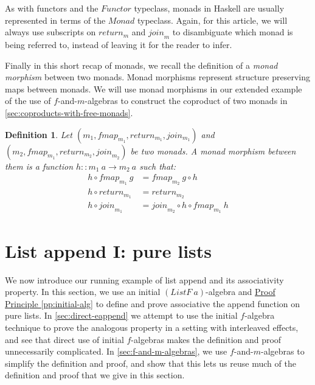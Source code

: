 \documentclass{jfp1}
\newtheorem{definition}{Definition}
\newcommand{\proofprinref}[1]{\hyperref[#1]{Proof Principle \ref*{#1}}}
\begin{document}
As with functors and the $\mathit{Functor}$ typeclass, monads in
Haskell are usually represented in terms of the $\textit{Monad}$
typeclass. Again, for this article, we will always use subscripts on
$\mathit{return}_m$ and $\mathit{join}_m$ to disambiguate which monad
is being referred to, instead of leaving it for the reader to infer.

Finally in this short recap of monads, we recall the definition of a
\emph{monad morphism} between two monads. Monad morphisms represent
structure preserving maps between monads. We will use monad morphisms
in our extended example of the use of $f$-and-$m$-algebras to
construct the coproduct of two monads in
\autoref{sec:coproducts-with-free-monads}.

\begin{definition}
  Let $(m_1, \mathit{fmap_{m_1}}, \mathit{return}_{m_1},
  \mathit{join_{m_1}})$ and $(m_2, \mathit{fmap_{m_1}},
  \mathit{return}_{m_2}, \mathit{join}_{m_2})$ be two monads. A
  \emph{monad morphism} between them is a function $h :: m_1~a \to
  m_2~a$ such that:
  \begin{align}
    \label{eq:monad-mor-natural}
    h \circ \mathit{fmap}_{m_1}~g & = \mathit{fmap}_{m_2}~g \circ h \\
    \label{eq:monad-mor-return}
    h \circ \mathit{return}_{m_1} & = \mathit{return}_{m_2} \\
    \label{eq:monad-mor-join}
    h \circ \mathit{join}_{m_1} & = \mathit{join}_{m_2} \circ h \circ \mathit{fmap}_{m_1}~h
  \end{align}
\end{definition}

\section{List append I: pure lists}
\label{sec:pure-append}

We now introduce our running example of list append and its
associativity property. In this section, we use an initial
$(\mathit{ListF}~a)$-algebra and \proofprinref{pp:initial-alg} to
define and prove associative the append function on pure lists. In
\autoref{sec:direct-eappend} we attempt to use the initial $f$-algebra
technique to prove the analogous property in a setting with
interleaved effects, and see that direct use of initial $f$-algebras
makes the definition and proof unnecessarily complicated. In
\autoref{sec:f-and-m-algebras}, we use $f$-and-$m$-algebras to
simplify the definition and proof, and show that this lets us reuse
much of the definition and proof that we give in this section.
\end{document}
